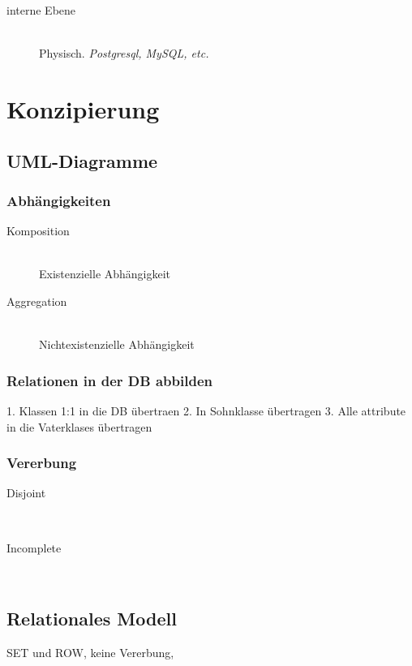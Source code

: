 \begin{multicols}{2}
\begin{description}
		\item[interne Ebene] \hfill \\
			Physisch. \emph{Postgresql, MySQL, etc.}
	\end{description}

\section{Konzipierung}	%
\subsection{UML-Diagramme}

\subsubsection{Abhängigkeiten}
\begin{description}
	\item[Komposition] \hfill \\
		Existenzielle Abhängigkeit
	\item[Aggregation] \hfill \\
		Nichtexistenzielle Abhängigkeit
\end{description}

\subsubsection{Relationen in der DB abbilden} %
1. Klassen 1:1 in die DB übertraen
2. In Sohnklasse übertragen
3. Alle attribute in die Vaterklases übertragen

\subsubsection{Vererbung}
\begin{description}
	\item[Disjoint] \hfill \\
	\item[Incomplete] \hfill \\
\end{description}
	
	
\subsection{Relationales Modell}
	
	SET und ROW, keine Vererbung,
	

\end{multicols}
